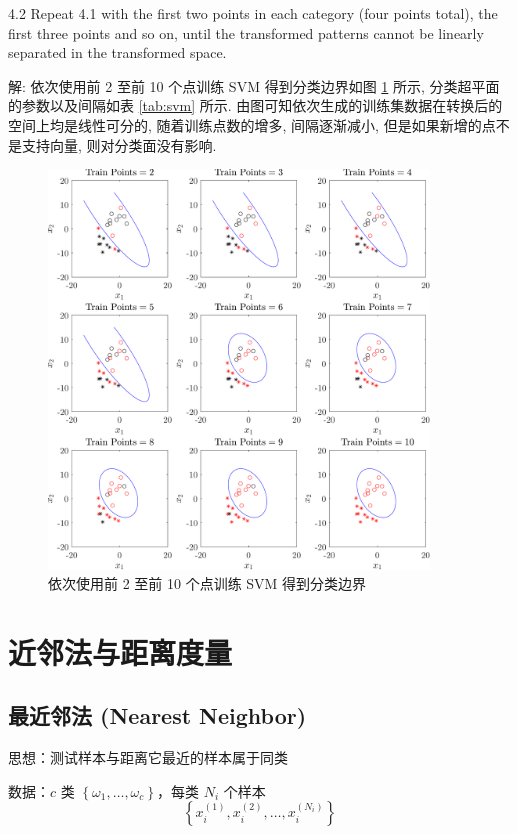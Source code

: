 \documentclass[openany]{ctexbook}
\theoremstyle{kaiti}
\theoremstyle{normal}
\begin{document}
4.2 Repeat 4.1 with the first two points in each category (four points total), the first three points and so on, until the transformed patterns cannot be linearly separated in the transformed space.

解: 依次使用前 2 至前 10 个点训练 SVM 得到分类边界如图 \ref{fig:svm2} 所示, 分类超平面的参数以及间隔如表 \ref{tab:svm} 所示. 由图可知依次生成的训练集数据在转换后的空间上均是线性可分的, 随着训练点数的增多, 间隔逐渐减小, 但是如果新增的点不是支持向量, 则对分类面没有影响.

\begin{figure}[htbp]
  \centering
  \includegraphics[width=0.9\textwidth]{svmPoint2-10.pdf}
  \caption{依次使用前 2 至前 10 个点训练 SVM 得到分类边界}
  \label{fig:svm2}
\end{figure}

\chapter{近邻法与距离度量}

\section{最近邻法 (Nearest Neighbor) }

思想：测试样本与距离它最近的样本属于同类

数据：$c$ 类 $\left\{ \omega_1,\dots ,\omega_c \right\}$，每类 $N_i$ 个样本
\begin{equation}
\left\{ x_{i}^{\left(1 \right)},x_{i}^{\left(2 \right)},\dots ,x_{i}^{\left(N_i \right)} \right\}
\end{equation}
\end{document}
